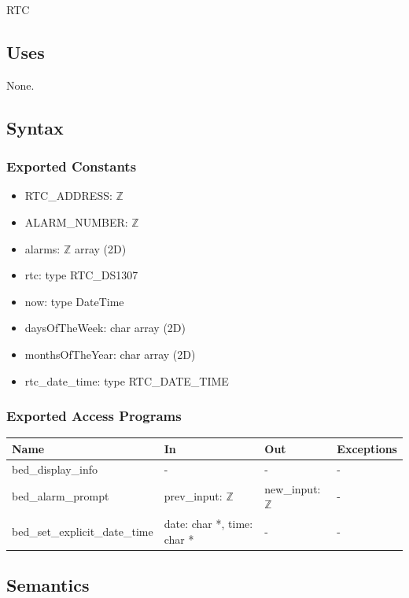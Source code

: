 \documentclass[12pt, titlepage]{article}
\begin{document}
RTC

\subsection{Uses}

None.

\subsection{Syntax}

\subsubsection{Exported Constants}

\begin{itemize}
\item RTC\_ADDRESS: $\mathbb{Z}$
\item ALARM\_NUMBER: $\mathbb{Z}$
\item alarms: $\mathbb{Z}$ array (2D)
\item rtc: type RTC\_DS1307
\item now: type DateTime
\item daysOfTheWeek: char array (2D)
\item monthsOfTheYear: char array (2D)
\item rtc\_date\_time: type RTC\_DATE\_TIME
\end{itemize}

\subsubsection{Exported Access Programs}

\begin{center}
\begin{tabular}{p{3cm} p{3cm} p{2cm} p{4cm}}
\hline
\textbf{Name} & \textbf{In} & \textbf{Out} & \textbf{Exceptions} \\
\hline
bed\_display\_info & - & - & -  \\
bed\_alarm\_prompt & prev\_input: $\mathbb{Z}$ & new\_input: $\mathbb{Z}$ & - \\
bed\_set\_explicit\_date\_time & date: char *, time: char * & - & - \\
\hline
\end{tabular}
\end{center}

\subsection{Semantics}
\end{document}
